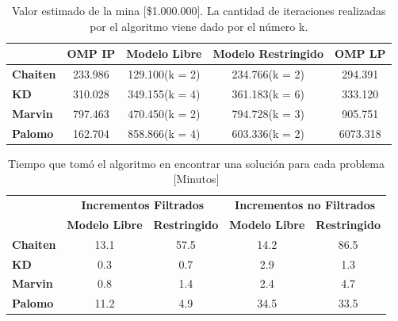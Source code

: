 \documentclass[12pt,letterpaper]{article}
\begin{document}
\begin{table}[H]
\centering
\begin{tabular}{|l|cccc|}
\hline
                 &\textbf{OMP IP} & \textbf{Modelo Libre} & \textbf{Modelo Restringido} & \textbf{OMP LP} \\ \hline
\textbf{Chaiten} & 233.986                   & 129.100(k = 2)               & 234.766(k = 2)                     & 294.391                    \\ \hline
\textbf{KD}      & 310.028                   & 349.155(k = 4)               & 361.183(k = 6)                     & 333.120                    \\ \hline
\textbf{Marvin}  & 797.463                   & 470.450(k = 2)               & 794.728(k = 3)                     & 905.751                    \\ \hline
\textbf{Palomo}  & 162.704                   & 858.866(k = 4)               & 603.336(k = 2)                   & 6073.318                   \\ \hline
\end{tabular}
\caption{Valor estimado de la mina [\$1.000.000]. La cantidad de iteraciones realizadas por el algoritmo viene dado por el número k.}
\end{table}

\begin{table}[H]
\centering
\begin{tabular}{|l|cc|cc|}
\hline
\multirow{2}{*}{} & \multicolumn{2}{c|}{\textbf{Incrementos Filtrados}}  & \multicolumn{2}{c|}{\textbf{Incrementos no Filtrados}}   \\ \cline{2-5} 
                  & \textbf{Modelo Libre} & \textbf{Restringido} & \textbf{Modelo Libre} & \textbf{Restringido} \\ \hline
\textbf{Chaiten}  & 13.1                  & 57.5                        & 14.2                  & 86.5                            \\ \hline
\textbf{KD}       & 0.3                   & 0.7                         & 2.9                   & 1.3                             \\ \hline
\textbf{Marvin}   & 0.8                   & 1.4                         & 2.4                   & 4.7                             \\ \hline
\textbf{Palomo}   & 11.2                  & 4.9                         & 34.5                & 33.5                            \\ \hline
\end{tabular}
\caption{Tiempo que tomó el algoritmo en encontrar una solución para cada problema [Minutos]}
\end{table}
\end{document}
